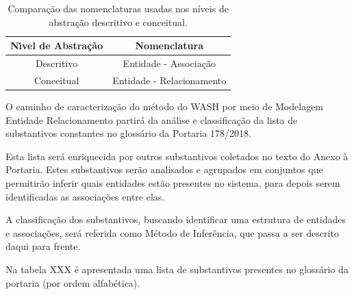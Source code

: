 \documentclass[
12pt,		%
openright,	%
twoside,  %
a4paper,			%
chapter=TITLE,		%
english,			%
french,				%
spanish,			%
brazil				%
]{USPSC-classe/USPSC}
\begin{document}
\begin{table}[htb]
\tiny
\caption{\label{89529551198bad4d68f6da15b612c6b28f6bdd01}Compara\c{c}\~ao das nomenclaturas usadas nos n\'{i}veis de abstra\c{c}\~ao descritivo e conceitual.}

\centering
\begin{tabular}{|c|c|}
\hline
N\'{\i}vel de Abstra\c{c}\~ao  &  Nomenclatura \\
\hline
Descritivo  &  Entidade - Associa\c{c}\~ao \\
Conceitual  &  Entidade - Relacionamento \\
\hline
\end{tabular}
\end{table}


O caminho de caracteriza\c{c}\~ao do m\'etodo do WASH por meio de Modelagem Entidade Relacionamento partir\'a da an\'alise e classifica\c{c}\~ao da lista de substantivos constantes no gloss\'ario da Portaria 178/2018.










Esta lista ser\'a enriquecida por outros substantivos coletados no texto do Anexo \`a Portaria. Estes substantivos ser\~ao analisados e agrupados em conjuntos que permitir\~ao inferir quais entidades est\~ao presentes no sistema, para depois serem identificadas as associa\c{c}\~oes entre elas.










A classifica\c{c}\~ao dos substantivos, buscando identificar uma estrutura de entidades e associa\c{c}\~oes, ser\'a referida como \textquotedbl M\'etodo de Infer\^encia\textquotedbl , que passa a ser descrito daqui para frente.










Na tabela XXX \'e apresentada uma lista de substantivos presentes no gloss\'ario da portaria (por ordem alfab\'etica).
\end{document}
